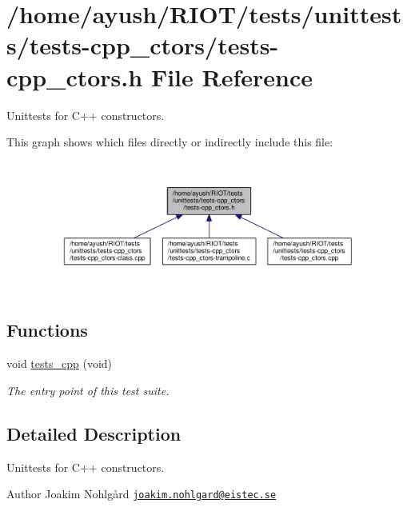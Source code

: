 \hypertarget{tests-cpp__ctors_8h}{}\section{/home/ayush/\+R\+I\+O\+T/tests/unittests/tests-\/cpp\+\_\+ctors/tests-\/cpp\+\_\+ctors.h File Reference}
\label{tests-cpp__ctors_8h}


Unittests for C++ constructors.  


This graph shows which files directly or indirectly include this file\+:
\nopagebreak
\begin{figure}[H]
\begin{center}
\leavevmode
\includegraphics[width=350pt]{tests-cpp__ctors_8h__dep__incl}
\end{center}
\end{figure}
\subsection*{Functions}
\begin{DoxyCompactItemize}
\item 
void \hyperlink{group__unittests_gaa3dd2eb88b82592a6fa7dd87aecd62b7}{tests\+\_\+cpp} (void)
\begin{DoxyCompactList}\small\item\em The entry point of this test suite. \end{DoxyCompactList}\end{DoxyCompactItemize}


\subsection{Detailed Description}
Unittests for C++ constructors. 

\begin{DoxyAuthor}{Author}
Joakim Nohlgård \href{mailto:joakim.nohlgard@eistec.se}{\tt joakim.\+nohlgard@eistec.\+se} 
\end{DoxyAuthor}
